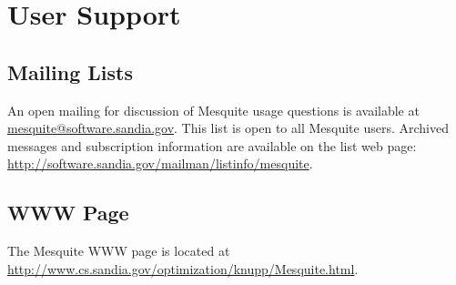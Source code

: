 \chapter{User Support}

\section{Mailing Lists}

An open mailing for discussion of Mesquite usage questions is available at
\href{mailto:mesquite@software.sandia.gov}{mesquite@software.sandia.gov}.  This list is open to all Mesquite users.  
Archived messages and subscription information are available on the list web 
page: \newline
\href{http://software.sandia.gov/mailman/listinfo/mesquite}{http://software.sandia.gov/mailman/listinfo/mesquite}.


\section{WWW Page}

The Mesquite WWW page is located at \newline
\url{http://www.cs.sandia.gov/optimization/knupp/Mesquite.html}.
